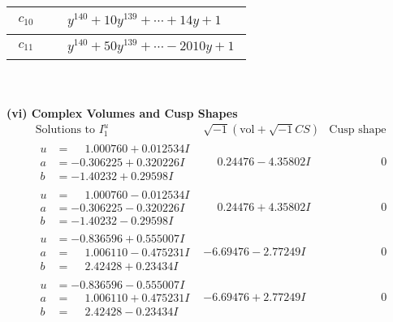 \documentclass[1p]{elsarticle_modified}
\theoremstyle{definition}
\newcommand{\I}{\sqrt{-1}}
\begin{document}
\begin{tabular}{m{50pt}|m{274pt}}
\hline $$\begin{aligned}c_{10}\end{aligned}$$&$\begin{aligned}
&y^{140}+10 y^{139}+\cdots+14 y+1
\end{aligned}$\\
\hline $$\begin{aligned}c_{11}\end{aligned}$$&$\begin{aligned}
&y^{140}+50 y^{139}+\cdots-2010 y+1
\end{aligned}$\\
\hline
\end{tabular}\\~\\
\newpage\flushleft \textbf{(vi) Complex Volumes and Cusp Shapes}
$$\begin{array}{c|c|c}  
\text{Solutions to }I^u_{1}& \I (\text{vol} + \sqrt{-1}CS) & \text{Cusp shape}\\
 \hline 
\begin{aligned}
u &= \phantom{-}1.000760 + 0.012534 I \\
a &= -0.306225 + 0.320226 I \\
b &= -1.40232 + 0.29598 I\end{aligned}
 & \phantom{-}0.24476 - 4.35802 I & \phantom{-0.000000 } 0 \\ \hline\begin{aligned}
u &= \phantom{-}1.000760 - 0.012534 I \\
a &= -0.306225 - 0.320226 I \\
b &= -1.40232 - 0.29598 I\end{aligned}
 & \phantom{-}0.24476 + 4.35802 I & \phantom{-0.000000 } 0 \\ \hline\begin{aligned}
u &= -0.836596 + 0.555007 I \\
a &= \phantom{-}1.006110 - 0.475231 I \\
b &= \phantom{-}2.42428 + 0.23434 I\end{aligned}
 & -6.69476 - 2.77249 I & \phantom{-0.000000 } 0 \\ \hline\begin{aligned}
u &= -0.836596 - 0.555007 I \\
a &= \phantom{-}1.006110 + 0.475231 I \\
b &= \phantom{-}2.42428 - 0.23434 I\end{aligned}
 & -6.69476 + 2.77249 I & \phantom{-0.000000 } 0 \\ \hline\begin{aligned}

\end{aligned}
\end{array}$$
\end{document}
